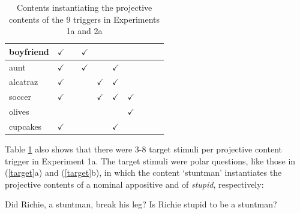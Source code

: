 \documentclass[11pt,fleqn]{article}
\newcommand{\6}{\mbox{$[\hspace*{-.6mm}[$}}
\newcommand{\9}{\mbox{$]\hspace*{-.6mm}]$}}
\begin{document}
\begin{table}[!h]
\begin{center}
\begin{tabular}{l|ccccccccc}
boyfriend & $\checkmark$ & & $\checkmark$ & & & & & &  \\

\hline

aunt & $\checkmark$ & & $\checkmark$ & & $\checkmark$ & & & &  \\

\hline

alcatraz & $\checkmark$ & & & $\checkmark$ & $\checkmark$ & & & &  \\

\hline

soccer & $\checkmark$ & & & $\checkmark$ & $\checkmark$ & $\checkmark$ & & &  \\

\hline

olives & & & & & & $\checkmark$ & & &  \\

\hline

cupcakes & $\checkmark$ & & & & $\checkmark$ & & & &  \\

\hline

\end{tabular}
\end{center}
\caption{Contents instantiating the projective contents of the 9 triggers in Experiments 1a and 2a}\label{t-trigger-content-pairs}
\end{table}

\newpage

Table \ref{t-trigger-content-pairs} also shows that there were 3-8 target stimuli per projective content trigger in Experiment 1a. The target stimuli were polar questions, like those in (\ref{target}a) and (\ref{target}b), in which the content `stuntman' instantiates the projective contents of a nominal appositive and of {\em stupid}, respectively:

\begin{exe}
\ex\label{target}
\begin{xlist}
\ex Did Richie, a stuntman, break his leg?
\ex Is Richie stupid to be a stuntman?
\end{xlist}
\end{exe}
\end{document}
